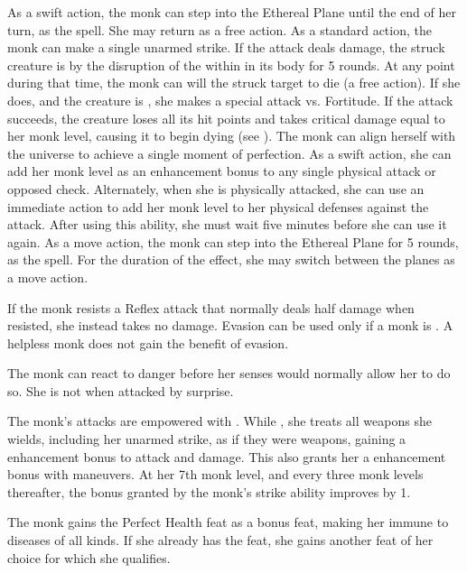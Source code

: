  As a swift action, the monk can step into the Ethereal Plane until the end of her turn, as the 
spell.
She may return as a free action.
As a standard action, the monk can make a single unarmed strike.
If the attack deals damage, the struck creature is \sickened by the disruption of the \ki within in its body for 5 rounds.
At any point during that time, the monk can will the struck target to die (a free action).
If she does, and the creature is \bloodied, she makes a special attack vs. Fortitude.
If the attack succeeds, the creature loses all its hit points and takes critical damage equal to her monk level, causing it to begin dying (see ).
The monk can align herself with the universe to achieve a single moment of perfection.
As a swift action, she can add her monk level as an enhancement bonus to any single physical attack or opposed check.
Alternately, when she is physically attacked, she can use an immediate action to add her monk level to her physical defenses against the attack.
After using this ability, she must wait five minutes before she can use it again.
 As a move action, the monk can step into the Ethereal Plane for 5 rounds, as the 
spell.
For the duration of the effect, she may switch between the planes as a move action.

If the monk resists a Reflex attack that normally deals half damage when resisted, she instead takes no damage.
Evasion can be used only if a monk is \unencumbered.
A helpless monk does not gain the benefit of evasion.

The monk can react to danger before her senses would normally allow her to do so.
She is not \unaware when attacked by surprise.

The monk's attacks are empowered with \ki.
While \monkunencumbered, she treats all weapons she wields, including her unarmed strike, as if they were  weapons, gaining a  enhancement bonus to attack and damage.
This also grants her a  enhancement bonus with maneuvers.
At her 7th monk level, and every three monk levels thereafter, the bonus granted by the monk's \ki strike ability improves by 1.


The monk gains the Perfect Health feat as a bonus feat, making her immune to diseases of all kinds.
If she already has the feat, she gains another feat of her choice for which she qualifies.

